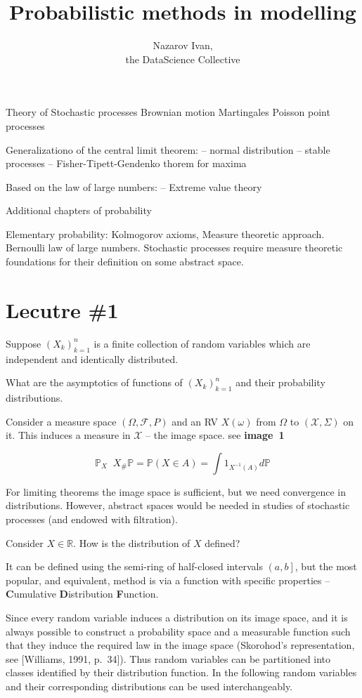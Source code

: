 \documentclass[a4paper]{article}
\title{Probabilistic methods in modelling}
\author{Nazarov Ivan, \rus{101мНОД(ИССА)}\\the DataScience Collective}
\newcommand{\ploc}[1]{{\left ( #1 \right ]}}
\newcommand{\brac}[1]{{\left ( #1 \right )}}
\newcommand{\Real}{\mathbb{R}}
\newcommand{\Xcal}{\mathcal{X}}
\newcommand{\Fcal}{\mathcal{F}}
\newcommand{\defn}{\mathop{\overset{\Delta}{=}}\nolimits}
\begin{document}
\maketitle

Theory of Stochastic processes
Brownian motion
Martingales
Poisson point processes

Generalizationo of the central limit theorem:
-- normal distribution
-- stable processes
-- Fisher-Tipett-Gendenko thorem for maxima

Based on the law of large numbers:
-- Extreme value theory

Additional chapters of probability

Elementary probability: Kolmogorov axioms, Measure theoretic approach.
Bernoulli law of large numbers.
Stochastic processes require measure theoretic foundations for their definition on some abstract space.

\section{Lecutre \#1} %
\label{sec:lecutre_1}


Suppose $\brac{X_k}_{k=1}^n$ is a finite collection of random variables which are independent and identically distributed.

What are the asymptotics of functions of $\brac{X_k}_{k=1}^n$ and their probability distributions.

Consider a measure space $(\Omega, \Fcal, P)$ and an RV $X(\omega)$ from $\Omega$ to $(\Xcal, \Sigma)$ on it.
This induces a measure in $\Xcal$ -- the image space. see \textbf{image~1}

\[\mathbb{P}_X \defn X_\# \mathbb{P} = \mathbb{P}\brac{X\in A} = \int 1_{X^{-1}(A)}d\mathbb{P}\]

For limiting theorems the image space is sufficient, but we need convergence in distributions. However, abstract spaces would be needed in studies of stochastic processes (and endowed with filtration).

Consider $X\in \Real$.
How is the distribution of $X$ defined?

It can be defined using the semi-ring of half-closed intervals $\ploc{a,b}$, but the most popular, and equivalent, method is via a function with specific properties -- \textbf{C}umulative \textbf{D}istribution \textbf{F}unction.

Since every random variable induces a distribution on its image space, and it is always possible to construct a probability space and a measurable function such that they induce the required law in the image space (Skorohod's representation, see [Williams, 1991, p.~34]).
Thus random variables can be partitioned into classes identified by their distribution function.
In the following random variables and their corresponding distributions can be used interchangeably.
\end{document}
